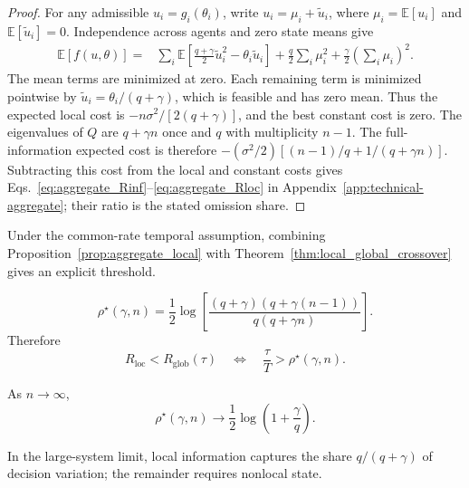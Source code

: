 \documentclass[11pt]{article}
\begin{document}
\begin{proof}
For any admissible $u_i=g_i(\theta_i)$, write
$u_i=\mu_i+\widetilde u_i$, where $\mu_i=\mathbb E[u_i]$ and
$\mathbb E[\widetilde u_i]=0$. Independence across agents and zero state
means give
\begin{align}
\mathbb E[f(u,\theta)]={}&
\sum_i\mathbb E\left[\frac{q+\gamma}{2}\widetilde u_i^2
-\theta_i\widetilde u_i\right]
+\frac q2\sum_i\mu_i^2+\frac\gamma2\left(\sum_i\mu_i\right)^2.
\label{eq:aggregate_centered_cost}
\end{align}
The mean terms are minimized at zero. Each remaining term is minimized
pointwise by $\widetilde u_i=\theta_i/(q+\gamma)$, which is feasible and
has zero mean. Thus the expected local cost is
$-n\sigma^2/[2(q+\gamma)]$, and the best constant cost is zero.
The eigenvalues of $Q$ are $q+\gamma n$ once and $q$ with multiplicity
$n-1$. The full-information expected cost is therefore
$-(\sigma^2/2)[(n-1)/q+1/(q+\gamma n)]$.
Subtracting this cost from the local and constant costs gives
Eqs.~\eqref{eq:aggregate_Rinf}--\eqref{eq:aggregate_Rloc} in
Appendix~\ref{app:technical-aggregate}; their ratio is the stated omission share.
\end{proof}

Under the common-rate temporal assumption, combining Proposition~\ref{prop:aggregate_local} with
Theorem~\ref{thm:local_global_crossover} gives an explicit threshold.

\begin{equation}
    \boxed{
    \rho^\star(\gamma,n)
    =
    \frac{1}{2}
    \log
    \left[
        \frac{
            (q+\gamma)
            \left(
                q+\gamma(n-1)
            \right)
        }{
            q(q+\gamma n)
        }
    \right].
    }
    \label{eq:aggregate_rho_star}
\end{equation}
Therefore
\begin{equation}
    R_{\mathrm{loc}}
    <
    R_{\mathrm{glob}}(\tau)
    \quad\Longleftrightarrow\quad
    \frac{\tau}{T}
    >
    \rho^\star(\gamma,n).
    \label{eq:aggregate_crossover}
\end{equation}

As $n\rightarrow\infty$,
\begin{equation}
    \boxed{
    \rho^\star(\gamma,n)
    \longrightarrow
    \frac{1}{2}
    \log
    \left(
        1+\frac{\gamma}{q}
    \right).
    }
    \label{eq:large_n_threshold}
\end{equation}

In the large-system limit, local information captures the share
$q/(q+\gamma)$ of decision variation; the remainder requires nonlocal state.
\end{document}
